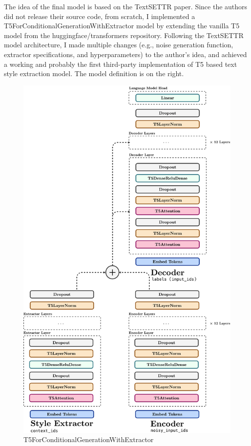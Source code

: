 \documentclass[a2paper]{article}
\begin{document}
The idea of the final model is based on the TextSETTR paper. Since the authors did not release their source code, from scratch, I implemented a T5ForConditionalGenerationWithExtractor model by extending the vanilla T5 model from the huggingface/transformers repository. Following the TextSETTR model architecture, I made multiple changes (e.g., noise generation function, extractor specifications, and hyperparameters) to the author's idea, and achieved a working and probably the first third-party implementation of T5 based text style extraction model. The model definition is on the right.
\begin{figure}[h!]
    \includegraphics[width=\linewidth]{model_df.pdf}
    \caption{T5ForConditionalGenerationWithExtractor}
    \label{fig:T5ForConditionalGenerationWithExtractor}
\end{figure}
\end{document}
